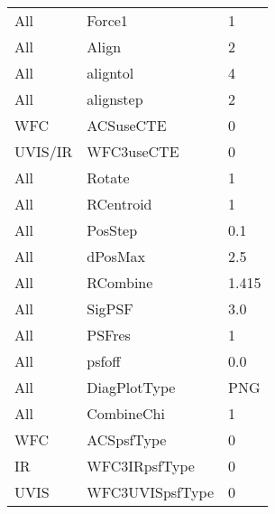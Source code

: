\begin{tabular}{lll}
     All &           Force1 &      1 \\
     All &            Align &      2 \\
     All &         aligntol &      4 \\
     All &        alignstep &      2 \\
     WFC &        ACSuseCTE &      0 \\
 UVIS/IR &       WFC3useCTE &      0 \\
     All &           Rotate &      1 \\
     All &        RCentroid &      1 \\
     All &          PosStep &    0.1 \\
     All &          dPosMax &    2.5 \\
     All &         RCombine &  1.415 \\
     All &           SigPSF &    3.0 \\
     All &           PSFres &      1 \\
     All &           psfoff &    0.0 \\
     All &     DiagPlotType &    PNG \\
     All &       CombineChi &      1 \\
     WFC &       ACSpsfType &      0 \\
      IR &    WFC3IRpsfType &      0 \\
    UVIS &  WFC3UVISpsfType &      0 \\
\bottomrule
\end{tabular}
